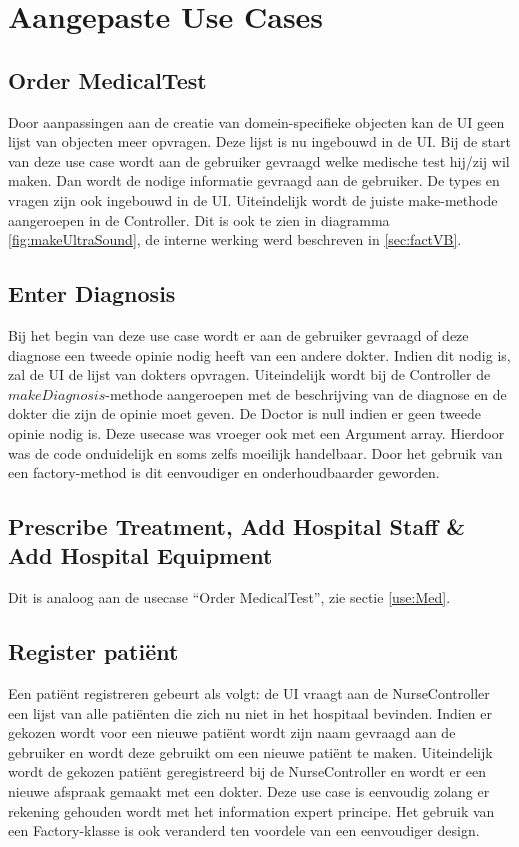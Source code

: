 \section{Aangepaste Use Cases\label{Volledig}}

\subsection{Order MedicalTest\label{use:Med}}
Door aanpassingen aan de creatie van domein-specifieke objecten kan de UI geen lijst van objecten meer opvragen. 
Deze lijst is nu ingebouwd in de UI. 
Bij de start van deze use case wordt aan de gebruiker gevraagd welke medische test hij/zij wil maken. 
Dan wordt de nodige informatie gevraagd aan de gebruiker. De types en vragen zijn ook ingebouwd in de UI.
Uiteindelijk wordt de juiste make-methode aangeroepen in de Controller. 
Dit is ook te zien in diagramma \ref{fig:makeUltraSound}, de interne werking werd beschreven in \ref{sec:factVB}.

\subsection{Enter Diagnosis}
Bij het begin van deze use case wordt er aan de gebruiker gevraagd of deze diagnose een tweede opinie nodig heeft van een andere dokter.
Indien dit nodig is, zal de UI de lijst van dokters opvragen. 
Uiteindelijk wordt bij de Controller de $makeDiagnosis$-methode aangeroepen met de beschrijving van de diagnose en de dokter die zijn de opinie moet geven.
De Doctor is null indien er geen tweede opinie nodig is.
Deze usecase was vroeger ook met een Argument array. Hierdoor was de code onduidelijk en soms zelfs moeilijk handelbaar. 
Door het gebruik van een factory-method is dit eenvoudiger en onderhoudbaarder geworden.

\subsection{Prescribe Treatment, Add Hospital Staff \& Add Hospital Equipment}
Dit is analoog aan de usecase ``Order MedicalTest'', zie sectie \ref{use:Med}. 

\subsection{Register patiënt}
Een patiënt registreren gebeurt als volgt: de UI vraagt aan de NurseController een lijst van alle patiënten die zich nu niet in het hospitaal bevinden.
Indien er gekozen wordt voor een nieuwe patiënt wordt zijn naam gevraagd aan de gebruiker en wordt deze gebruikt om een nieuwe patiënt te maken. 
Uiteindelijk wordt de gekozen patiënt geregistreerd bij de NurseController en wordt er een nieuwe afspraak gemaakt met een dokter.
Deze use case is eenvoudig zolang er rekening gehouden wordt met het information expert principe. 
Het gebruik van een Factory-klasse is ook veranderd ten voordele van een eenvoudiger design.


